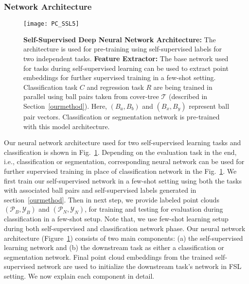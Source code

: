 \documentclass{article}
\begin{document}
\subsubsection{Network Architecture}
\label{ssec:arch}
\begin{figure}[tbp]
	\centering
\texttt{[image: PC\_SSL5]}
	\caption{\textbf{Self-Supervised Deep Neural Network Architecture:} The architecture is used for pre-training using self-supervised labels for two independent tasks. \textbf{Feature Extractor:} The base network used for tasks during self-supervised learning can be used to extract point embeddings for further supervised training in a few-shot setting. Classification task $C$ and regression task $R$ are being trained in parallel using ball pairs taken from cover-tree $\mathcal{T}$ (described in Section~\ref{ourmethod}). Here, $(B_a,B_b)$ and $(B_x,B_y)$ represent ball pair vectors. Classification or segmentation network is pre-trained with this model architecture.}
	\label{fig:arch}
\end{figure}
Our neural network architecture used for two self-supervised learning tasks and classification is shown in Fig.~\ref{fig:arch}. Depending on the evaluation task in the end, i.e., classification or segmentation, corresponding neural network can be used for further supervised training in place of classification network in the Fig.~\ref{fig:arch}. We first train our self-supervised network in a few-shot setting using both the tasks with associated ball pairs and self-supervised labels generated in section~\ref{ourmethod}. Then in next step, we provide labeled point clouds $(\mathcal{P}_{B},\mathcal{Y}_{B})$ and $(\mathcal{P}_{N},\mathcal{Y}_{N})$, for training and testing for evaluation during classification in a few-shot setup. Note that, we use few-shot learning setup during both self-supervised and classification network phase.
\fi
Our neural network architecture (Figure~\ref{fig:arch}) consists of two main components: (a) the self-supervised learning network and (b) the downstream task as either a classification or segmentation network. Final point cloud embeddings from the trained self-supervised network are used to initialize the downstream task's network in FSL setting. We now explain each component in detail.
\end{document}
